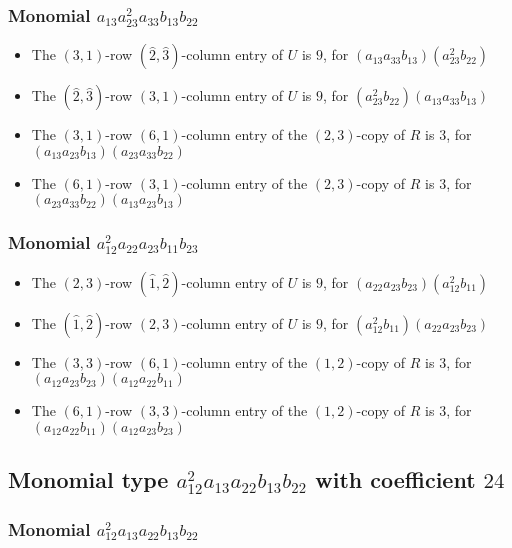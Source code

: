 \documentclass{article}
\begin{document}
\subsubsection{Monomial $ a_{13} a_{23}^{2} a_{33} b_{13} b_{22} $}

\begin{itemize}
\item The $ \left(3, 1\right) $-row $ (\hat{2}, \hat{3}) $-column entry of $U$ is $ 9 $, for $( a_{13} a_{33} b_{13} )( a_{23}^{2} b_{22} )$ 
\item The $(\hat{2}, \hat{3})$-row $ \left(3, 1\right) $-column entry of $U$ is $ 9 $, for $( a_{23}^{2} b_{22} )( a_{13} a_{33} b_{13} )$ 
\item The $(3, 1)$-row $(6, 1)$-column entry of the $ \left(2, 3\right) $-copy of $R$ is $ 3 $, for $( a_{13} a_{23} b_{13} )( a_{23} a_{33} b_{22} )$ 
\item The $(6, 1)$-row $(3, 1)$-column entry of the $ \left(2, 3\right) $-copy of $R$ is $ 3 $, for $( a_{23} a_{33} b_{22} )( a_{13} a_{23} b_{13} )$ 
\end{itemize}
\subsubsection{Monomial $ a_{12}^{2} a_{22} a_{23} b_{11} b_{23} $}

\begin{itemize}
\item The $ \left(2, 3\right) $-row $ (\hat{1}, \hat{2}) $-column entry of $U$ is $ 9 $, for $( a_{22} a_{23} b_{23} )( a_{12}^{2} b_{11} )$ 
\item The $(\hat{1}, \hat{2})$-row $ \left(2, 3\right) $-column entry of $U$ is $ 9 $, for $( a_{12}^{2} b_{11} )( a_{22} a_{23} b_{23} )$ 
\item The $(3, 3)$-row $(6, 1)$-column entry of the $ \left(1, 2\right) $-copy of $R$ is $ 3 $, for $( a_{12} a_{23} b_{23} )( a_{12} a_{22} b_{11} )$ 
\item The $(6, 1)$-row $(3, 3)$-column entry of the $ \left(1, 2\right) $-copy of $R$ is $ 3 $, for $( a_{12} a_{22} b_{11} )( a_{12} a_{23} b_{23} )$ 
\end{itemize}
\subsection{Monomial type $ a_{12}^{2} a_{13} a_{22} b_{13} b_{22} $ with coefficient $ 24 $}

\subsubsection{Monomial $ a_{12}^{2} a_{13} a_{22} b_{13} b_{22} $}
\end{document}
